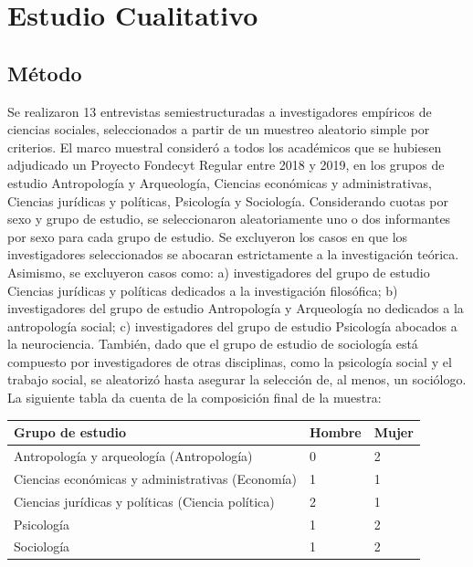 \documentclass[
  letterpaper,
  DIV=11,
  numbers=noendperiod]{scrreprt}
\begin{document}
\hypertarget{estudio-cualitativo}{%
\chapter{Estudio Cualitativo}\label{estudio-cualitativo}}

\hypertarget{muxe9todo}{%
\section{Método}\label{muxe9todo}}

Se realizaron 13 entrevistas semiestructuradas a investigadores
empíricos de ciencias sociales, seleccionados a partir de un muestreo
aleatorio simple por criterios. El marco muestral consideró a todos los
académicos que se hubiesen adjudicado un Proyecto Fondecyt Regular entre
2018 y 2019, en los grupos de estudio Antropología y Arqueología,
Ciencias económicas y administrativas, Ciencias jurídicas y políticas,
Psicología y Sociología. Considerando cuotas por sexo y grupo de
estudio, se seleccionaron aleatoriamente uno o dos informantes por sexo
para cada grupo de estudio. Se excluyeron los casos en que los
investigadores seleccionados se abocaran estrictamente a la
investigación teórica. Asimismo, se excluyeron casos como: a)
investigadores del grupo de estudio Ciencias jurídicas y políticas
dedicados a la investigación filosófica; b) investigadores del grupo de
estudio Antropología y Arqueología no dedicados a la antropología
social; c) investigadores del grupo de estudio Psicología abocados a la
neurociencia. También, dado que el grupo de estudio de sociología está
compuesto por investigadores de otras disciplinas, como la psicología
social y el trabajo social, se aleatorizó hasta asegurar la selección
de, al menos, un sociólogo. La siguiente tabla da cuenta de la
composición final de la muestra:

\begin{longtable}[]{@{}lll@{}}
\toprule\noalign{}
Grupo de estudio & Hombre & Mujer \\
\midrule\noalign{}
\endhead
\bottomrule\noalign{}
\endlastfoot
Antropología y arqueología (Antropología) & 0 & 2 \\
Ciencias económicas y administrativas (Economía) & 1 & 1 \\
Ciencias jurídicas y políticas (Ciencia política) & 2 & 1 \\
Psicología & 1 & 2 \\
Sociología & 1 & 2 \\
\end{longtable}
\end{document}
